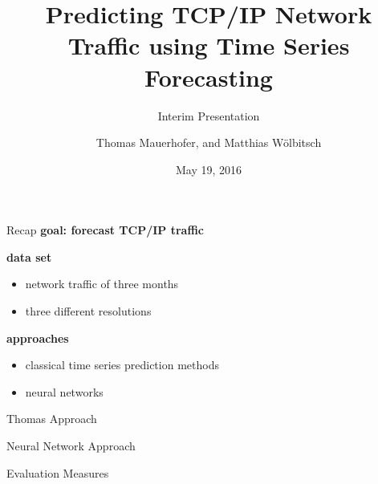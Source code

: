 \documentclass{beamer}
\title{Predicting TCP/IP Network Traffic using Time Series Forecasting}
\subtitle{Interim Presentation}
\date{May 19, 2016}
\author{Thomas Mauerhofer, and Matthias Wölbitsch}
\begin{document}
  \maketitle
  
  \begin{frame}{Recap}   
    \textbf{goal: forecast TCP/IP traffic}
    
    \vspace{15pt}
    
    \textbf{data set}
    \begin{itemize}
     \item network traffic of three months
     \item three different resolutions
    \end{itemize}
    
    \textbf{approaches}
    \begin{itemize}
     \item classical time series prediction methods
     \item neural networks
    \end{itemize}
  \end{frame}
 
 
  \begin{frame}{Thomas Approach}
   
  \end{frame}

  
  \begin{frame}{Neural Network Approach}
   
  \end{frame}

  
  \begin{frame}{Evaluation Measures}
   
  \end{frame}

  
  
\end{document}

